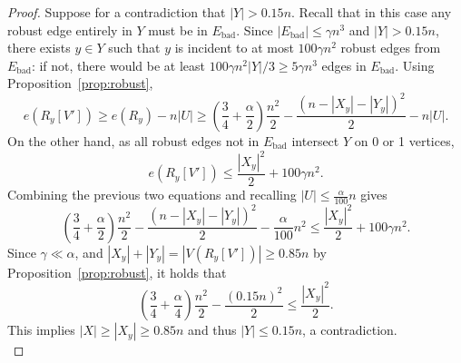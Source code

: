 \documentclass[A4paper,12pt]{article}
\theoremstyle{definition}
\begin{document}
\begin{proof}[Proof]
    Suppose for a contradiction that $|Y|> 0.15n$. Recall that in this case any robust edge entirely in $Y$ must be in $E_{\textrm{bad}}$. Since $|E_{\textrm{bad}}|\leq \gamma n^3$ and $|Y|>0.15n$, there exists $y\in Y$ such that $y$ is incident to at most $100\gamma n^2$ robust edges from $E_{\textrm{bad}}$: if not, there would be at least $100\gamma n^2|Y|/3 \ge 5\gamma n^3$ edges in $E_{\textrm{bad}}$.  Using Proposition~\ref{prop:robust},
    \begin{equation}
    \label{ineq:lowerRya}
    e(R_y[V'])\geq e(R_y)- n|U|\geq\left(\frac{3}{4}+\frac{\alpha}{2}\right)\frac{n^2}{2}-\frac{(n-|X_y|-|Y_y|)^2}{2}-n|U|.
    \end{equation}
    On the other hand, as all robust edges not in $E_{\textrm{bad}}$ intersect $Y$ on 0 or 1 vertices,
        \begin{equation*}
    e(R_y[V'])\leq \frac{|X_y|^2}{2}+100\gamma n^2.
    \end{equation*}
    Combining the previous two equations and recalling $|U| \le \frac{\alpha}{100}n$ gives
            \begin{equation*}
 \left(\frac{3}{4}+\frac{\alpha}{2}\right)\frac{n^2}{2}-\frac{(n-|X_y|-|Y_y|)^2}{2}-\frac{\alpha}{100}n^2 \leq \frac{|X_y|^2}{2}+100\gamma n^2.
    \end{equation*} 
Since $\gamma\ll \alpha$, and $|X_y|+|Y_y| = |V(R_y[V'])|\geq 0.85n$ by Proposition~\ref{prop:robust}, it holds that
            \begin{equation*}
 \left(\frac{3}{4}+\frac{\alpha}{4}\right)\frac{n^2}{2}-\frac{(0.15n)^2}{2}\leq \frac{|X_y|^2}{2}.
    \end{equation*} 
    This implies $|X|\geq |X_y|\geq 0.85n $ and thus $|Y|\leq 0.15n$, a contradiction. \\
    

\end{proof}
\end{document}
